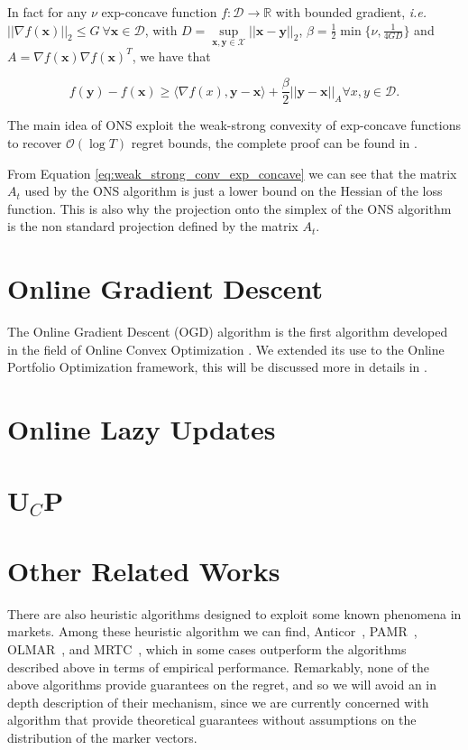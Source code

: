 In fact for any $\nu$ exp-concave function $f:\mathcal D\to\mathbb R$ with bounded gradient, \emph{i.e.} $||\nabla f(\mathbf x)||_2\le G\ \forall \mathbf x\in\mathcal D$, with $D=\sup\limits_{\mathbf x,\mathbf y\in\mathcal X}||\mathbf x-\mathbf y||_2$, $\beta=\frac{1}{2}\min\{\nu,\frac{1}{4GD}\}$ and $A=\nabla f(\mathbf x)\nabla f(\mathbf x)^T$, we have that 

\begin{equation}\label{eq:weak_strong_conv_exp_concave}
f(\mathbf y)-f(\mathbf x)\ge\langle\nabla f(x),\mathbf y-\mathbf x\rangle+\frac{\beta}{2}||\mathbf y-\mathbf x||_{A}\forall x,y\in\mathcal D.
\end{equation}

The main idea of ONS exploit the weak-strong convexity of exp-concave functions to recover $\mathcal O(\log T)$ regret bounds, the complete proof can be found in \cite{hazan2007logarithmic}.

From Equation \eqref{eq:weak_strong_conv_exp_concave} we can see that the matrix $A_t$ used by the ONS algorithm is just a lower bound on the Hessian of the loss function. This is also why the projection onto the simplex of the ONS algorithm is the non standard projection defined by the matrix $A_t$.

\section{Online Gradient Descent}

The Online Gradient Descent (OGD) algorithm is the first algorithm developed in the field of Online Convex Optimization \cite{zinkevich2003online}. We extended its use to the Online Portfolio Optimization framework, this will be discussed more in details in .  

\section{Online Lazy Updates}

\section{U$_C$P}

\section{Other Related Works}

There are also heuristic algorithms designed to exploit some known phenomena in markets. Among these heuristic algorithm we can find, Anticor~\cite{borodin2004can}, PAMR~\cite{li2012pamr}, OLMAR~\cite{li2015moving}, and MRTC~\cite{yang2018reversion}, which in some cases outperform the algorithms described above in terms of empirical performance. 
Remarkably, none of the above algorithms provide guarantees on the regret, and so we will avoid an in depth description of their mechanism, since we are currently concerned with algorithm that provide theoretical guarantees without assumptions on the distribution of the marker vectors.

